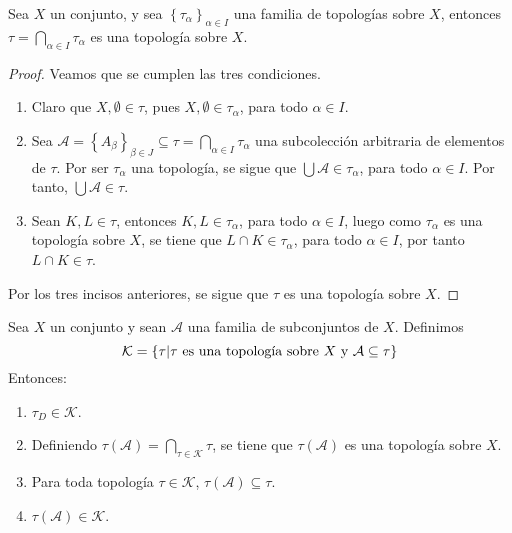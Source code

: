 \documentclass[12pt]{report}
\theoremstyle{largebreak}
\begin{document}
    \begin{theor}
        Sea $X$ un conjunto, y sea $\left\{\tau_\alpha\right\}_{\alpha\in I}$ una familia de topologías sobre $X$, entonces $\tau=\bigcap_{\alpha\in I}\tau_\alpha$ es una topología sobre $X$.
    \end{theor}

    \begin{proof}
        Veamos que se cumplen las tres condiciones.
        \begin{enumerate}
            \item Claro que $X,\emptyset\in\tau$, pues $X,\emptyset\in\tau_\alpha$, para todo $\alpha\in I$.
            \item Sea $\mathcal{A}=\left\{A_\beta\right\}_{\beta\in J}\subseteq\tau=\bigcap_{\alpha\in I}\tau_\alpha$ una subcolección arbitraria de elementos de $\tau$. Por ser $\tau_\alpha$ una topología, se sigue que $\bigcup\mathcal{A}\in\tau_\alpha$, para todo $\alpha\in I$. Por tanto, $\bigcup\mathcal{A}\in\tau$.
            \item Sean $K,L\in\tau$, entonces $K,L\in\tau_\alpha$, para todo $\alpha\in I$, luego como $\tau_\alpha$ es una topología sobre $X$, se tiene que $L\cap K\in \tau_\alpha$, para todo $\alpha\in I$, por tanto $L\cap K\in\tau$.
        \end{enumerate}
        Por los tres incisos anteriores, se sigue que $\tau$ es una topología sobre $X$.
    \end{proof}

    \begin{cor}
        Sea $X$ un conjunto y sean $\mathcal{A}$ una familia de subconjuntos de $X$. Definimos
        \begin{equation*}
            \mathcal{K}=\left\{\tau|\tau\textup{ es una topología sobre }X\textup{ y }\mathcal{A}\subseteq\tau \right\}
        \end{equation*}
        Entonces:
        \begin{enumerate}
            \item $\tau_D\in\mathcal{K}$.
            \item Definiendo $\tau(\mathcal{A})=\bigcap_{\tau\in\mathcal{K}}\tau$, se tiene que $\tau(\mathcal{A})$ es una topología sobre $X$.
            \item Para toda topología $\tau\in\mathcal{K}$, $\tau(\mathcal{A})\subseteq\tau$.
            \item $\tau(\mathcal{A})\in\mathcal{K}$.
        \end{enumerate}
    \end{cor}
\end{document}
